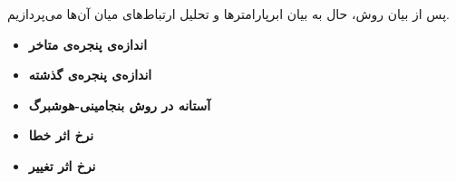 \documentclass[a4paper,11px]{article}
\begin{document}

پس از بیان روش، حال به بیان ابرپارامترها
و تحلیل ارتباط‌های میان آن‌ها می‌پردازیم.
\begin{itemize}
\item \textbf{
اندازه‌ی پنجره‌ی متاخر
}

\item \textbf{
اندازه‌ی پنجره‌ی گذشته
}

\item \textbf{
آستانه در روش بنجامینی-هوشبرگ
}

\item \textbf{
نرخ اثر خطا
}

\item \textbf{
نرخ اثر تغییر
}
\end{itemize}
\end{document}
